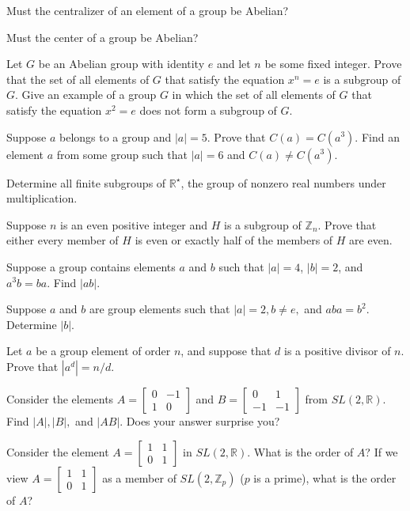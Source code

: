 \documentclass[11pt,largemargins]{homework}
\begin{document}
\question
Must the centralizer of an element of a group be Abelian?

\question
Must the center of a group be Abelian?

\question
Let $G$ be an Abelian group with identity $e$ and let $n$ be some fixed integer. Prove that the set of all elements 
of $G$ that satisfy the equation $x^n=e$ is a subgroup of $G$. Give an example of a group $G$ in which the set of all elements of 
$G$ that satisfy the equation $x^2=e$ does not form a subgroup of $G$.

\question
Suppose $a$ belongs to a group and $|a|=5$. Prove that $C(a)=C(a^3)$. Find an element $a$ from some group such 
that $|a|=6$ and $C(a)\neq C(a^3)$.

\question
Determine all finite subgroups of $\mathbb{R}^{\star}$, the group of nonzero real numbers under multiplication.

\question
Suppose $n$ is an even positive integer and $H$ is a subgroup of $\mathbb{Z}_n$. Prove that either every member of $H$ is 
even or exactly half of the members of $H$ are even.

\question
Suppose a group contains elements $a$ and $b$ such that $|a|=4$, $|b|=2$, and $a^3b=ba$. Find $|ab|$.

\question
Suppose $a$ and $b$ are group elements such that $|a|=2, b\neq e,$ and $aba=b^2$. Determine $|b|$.

\question
Let $a$ be a group element of order $n$, and suppose that $d$ is a positive divisor of $n$. Prove that $|a^d|=n/d$.

\question
Consider the elements $A = \begin{bmatrix} 0 & -1 \\ 1 & 0 \end{bmatrix}$ and $B = \begin{bmatrix} 0 & 1 \\ -1 & -1 \end{bmatrix}$
from $SL(2, \mathbb{R})$. Find $|A|,|B|,$ and $|AB|$. Does your answer surprise you?

\question
Consider the element $A = \begin{bmatrix} 1 & 1 \\ 0 & 1 \end{bmatrix}$ in $SL(2,\mathbb{R})$. What is the order of $A$? 
If we view $A = \begin{bmatrix} 1 & 1 \\ 0 & 1 \end{bmatrix}$ as a member of $SL(2,\mathbb{Z}_p)$ ($p$ is a prime), 
what is the order of $A$?
\end{document}
